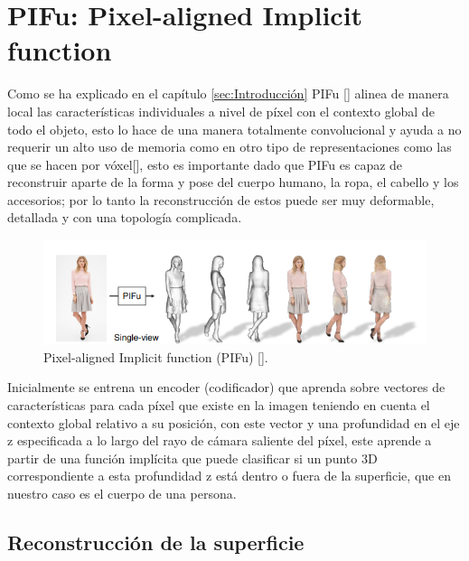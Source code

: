 \section{PIFu: Pixel-aligned Implicit function}
Como se ha explicado en el capítulo \ref{sec:Introducción} PIFu [\cite{pifu}] alinea de manera local las características individuales a nivel de píxel con el contexto global de todo el objeto, esto lo hace de una manera totalmente convolucional y ayuda a no requerir un alto uso de memoria como en otro tipo de representaciones como las que se hacen por vóxel[\cite{bodynet}], esto es importante dado que PIFu es capaz de reconstruir aparte de la forma y pose del cuerpo humano, la ropa, el cabello y los accesorios; por lo tanto la reconstrucción de estos puede ser muy deformable, detallada y con una topología complicada.

\begin{figure}[!h]
	\centering
	\includegraphics[scale=0.7]{imagenes/antecedentes1.png}
	\caption{Pixel-aligned Implicit function (PIFu) [\cite{pifu}].}
	\label{fig:figura7}
\end{figure}
\pagebreak

Inicialmente se entrena un encoder (codificador) que aprenda sobre vectores de características para cada píxel que existe en la imagen teniendo en cuenta el contexto global relativo a su posición, con este vector y una profundidad en el eje z especificada a lo largo del rayo de cámara saliente del píxel, este aprende a partir de una función implícita que puede clasificar si un punto 3D correspondiente a esta profundidad z está dentro o fuera de la superficie, que en nuestro caso es el cuerpo de una persona.

\subsection{Reconstrucción de la superficie}

